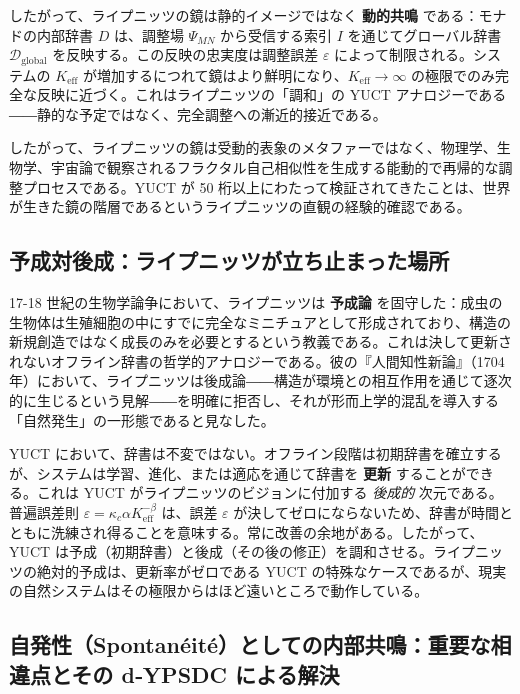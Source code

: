 \documentclass[12pt,a4paper]{article}
\begin{document}
	したがって、ライプニッツの鏡は静的イメージではなく \textbf{動的共鳴} である：モナドの内部辞書 \(D\) は、調整場 \(\Psi_{MN}\) から受信する索引 \(I\) を通じてグローバル辞書 \(\mathcal{D}_{\text{global}}\) を反映する。この反映の忠実度は調整誤差 \(\varepsilon\) によって制限される。システムの \(K_{\mathrm{eff}}\) が増加するにつれて鏡はより鮮明になり、\(K_{\mathrm{eff}} \to \infty\) の極限でのみ完全な反映に近づく。これはライプニッツの「調和」の YUCT アナロジーである――静的な予定ではなく、完全調整への漸近的接近である。
	
	したがって、ライプニッツの鏡は受動的表象のメタファーではなく、物理学、生物学、宇宙論で観察されるフラクタル自己相似性を生成する能動的で再帰的な調整プロセスである。YUCT が 50 桁以上にわたって検証されてきたことは、世界が生きた鏡の階層であるというライプニッツの直観の経験的確認である。
	
	\subsection{予成対後成：ライプニッツが立ち止まった場所}
	
	17-18 世紀の生物学論争において、ライプニッツは \textbf{予成論} を固守した：成虫の生物体は生殖細胞の中にすでに完全なミニチュアとして形成されており、構造の新規創造ではなく成長のみを必要とするという教義である。これは決して更新されないオフライン辞書の哲学的アナロジーである。彼の『人間知性新論』（1704年）において、ライプニッツは後成論――構造が環境との相互作用を通じて逐次的に生じるという見解――を明確に拒否し、それが形而上学的混乱を導入する「自然発生」の一形態であると見なした。
	
	YUCT において、辞書は不変ではない。オフライン段階は初期辞書を確立するが、システムは学習、進化、または適応を通じて辞書を \textbf{更新} することができる。これは YUCT がライプニッツのビジョンに付加する \emph{後成的} 次元である。普遍誤差則 \(\varepsilon = \kappa_c \alpha K_{\mathrm{eff}}^{-\beta}\) は、誤差 \(\varepsilon\) が決してゼロにならないため、辞書が時間とともに洗練され得ることを意味する。常に改善の余地がある。したがって、YUCT は予成（初期辞書）と後成（その後の修正）を調和させる。ライプニッツの絶対的予成は、更新率がゼロである YUCT の特殊なケースであるが、現実の自然システムはその極限からはほど遠いところで動作している。
	
	\subsection{自発性（Spontanéité）としての内部共鳴：重要な相違点とその d‑YPSDC による解決}
	
\end{document}
